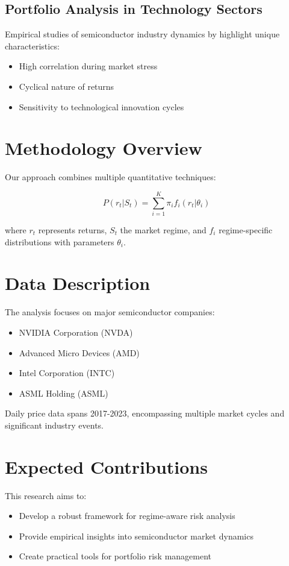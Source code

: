 \subsection{Portfolio Analysis in Technology Sectors}
Empirical studies of semiconductor industry dynamics by \cite{author2020} highlight unique characteristics:
\begin{itemize}
    \item High correlation during market stress
    \item Cyclical nature of returns
    \item Sensitivity to technological innovation cycles
\end{itemize}

\section{Methodology Overview}
Our approach combines multiple quantitative techniques:

\begin{equation}
    P(r_t|S_t) = \sum_{i=1}^{K} \pi_i f_i(r_t|\theta_i)
\end{equation}

where $r_t$ represents returns, $S_t$ the market regime, and $f_i$ regime-specific distributions with parameters $\theta_i$.

\section{Data Description}
The analysis focuses on major semiconductor companies:
\begin{itemize}
    \item NVIDIA Corporation (NVDA)
    \item Advanced Micro Devices (AMD)
    \item Intel Corporation (INTC)
    \item ASML Holding (ASML)
\end{itemize}

Daily price data spans 2017-2023, encompassing multiple market cycles and significant industry events.

\section{Expected Contributions}
This research aims to:
\begin{itemize}
    \item Develop a robust framework for regime-aware risk analysis
    \item Provide empirical insights into semiconductor market dynamics
    \item Create practical tools for portfolio risk management
\end{itemize}

